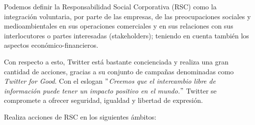 Podemos definir la Responsabilidad Social Corporativa (RSC) como la integración voluntaria, por parte de las empresas, de las preocupaciones sociales y medioambientales en sus operaciones comerciales y en sus relaciones con sus interlocutores o partes interesadas (stakeholders); teniendo en cuenta también los aspectos económico-financieros. 

Con respecto a esto, Twitter está bastante concienciada y realiza una gran cantidad de acciones, gracias a su conjunto de campañas denominadas como \textit{Twitter for Good}. Con el eslogan \textit{$"$Creemos que el intercambio libre de información puede tener un impacto positivo en el mundo.$"$} Twitter se compromete a ofrecer seguridad, igualdad y libertad de expresión.

Realiza acciones de RSC en los siguientes ámbitos:


